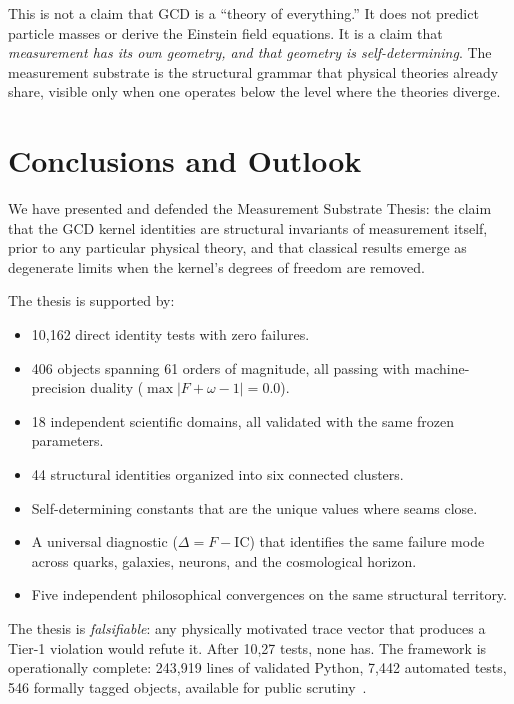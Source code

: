 \documentclass[
  aps,
  prd,
  twocolumn,
  superscriptaddress,
  nofootinbib,
  floatfix
]{revtex4-2}
\newcommand{\IC}{\mathrm{IC}}
\begin{document}
This is not a claim that GCD is a ``theory of everything.''  It does
not predict particle masses or derive the Einstein field equations.
It is a claim that \emph{measurement has its own geometry, and that
geometry is self-determining}.  The measurement substrate is the
structural grammar that physical theories already share, visible only
when one operates below the level where the theories diverge.

\section{Conclusions and Outlook}\label{sec:conclusions}

We have presented and defended the Measurement Substrate Thesis:
the claim that the GCD kernel identities are structural invariants
of measurement itself, prior to any particular physical theory, and
that classical results emerge as degenerate limits when the kernel's
degrees of freedom are removed.

The thesis is supported by:
\begin{itemize}[leftmargin=*]
\item 10{,}162 direct identity tests with zero failures.
\item 406 objects spanning 61 orders of magnitude, all passing with
  machine-precision duality ($\max|F + \omega - 1| = 0.0$).
\item 18 independent scientific domains, all validated with the same
  frozen parameters.
\item 44 structural identities organized into six connected clusters.
\item Self-determining constants that are the unique values where
  seams close.
\item A universal diagnostic ($\Delta = F - \IC$) that identifies
  the same failure mode across quarks, galaxies, neurons, and the
  cosmological horizon.
\item Five independent philosophical convergences on the same
  structural territory.
\end{itemize}

\noindent The thesis is \emph{falsifiable}: any physically motivated
trace vector that produces a Tier-1 violation would refute it.
After 10{,}27 tests, none has.  The framework is operationally
complete: 243{,}919 lines of validated Python, 7{,}442 automated
tests, 546 formally tagged objects, available for public
scrutiny~\cite{umcpmetadatarepo}.
\end{document}
